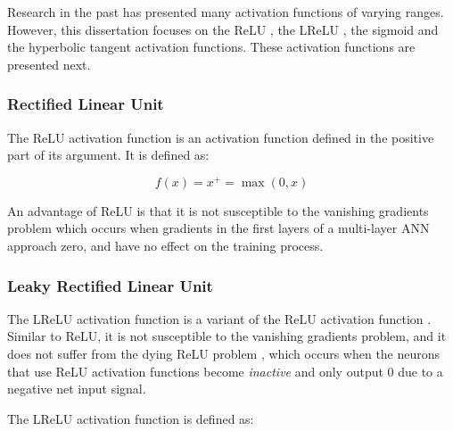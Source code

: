 \noindent Research in the past has presented many activation functions \cite{ref:karlik:2011} of varying ranges. However,
this dissertation focuses on the \ac{ReLU} \cite{ref:jarrett:2009, ref:nair:2010}, the
\ac{LReLU} \cite{ref:maas:2013}, the sigmoid \cite{ref:lecun:1988} and the
hyperbolic tangent \cite{ref:lin:2008} activation functions. These activation
functions are presented next.


\subsubsection{Rectified Linear Unit}
\label{sec:anns:an:act_functions:relu}

The \ac{ReLU} activation function is an
activation function defined in the positive part of
its argument. It is defined as:

\begin{equation}
    f(x) = x^{+} = \max(0,x)
    \label{eq:relu}
\end{equation}

\noindent An advantage of \ac{ReLU} is that it is not susceptible to the
vanishing gradients problem \cite{ref:xu:2015,
ref:maksutov:2018} which occurs when gradients in the first layers of a
multi-layer \ac{ANN} approach zero, and have no effect on the training process.


\subsubsection{Leaky Rectified Linear Unit}
\label{sec:anns:an:act_functions:leaky_relu}

The \ac{LReLU} activation function is a variant of
the \ac{ReLU} activation function \cite{ref:xu:2015}.
Similar to \ac{ReLU}, it is not susceptible to the vanishing gradients problem, and it does not suffer from the dying \ac{ReLU} problem \cite{ref:agarap:2018}, which occurs when
the neurons that use \ac{ReLU} activation functions
become \textit{inactive} and only output $0$ due to a negative net input signal.

The \ac{LReLU} activation function is defined as:
	
